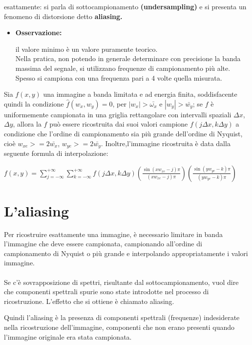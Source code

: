 esattamente: si parla di sottocampionamento \textbf{(undersampling)} e si
presenta un fenomeno di distorsione detto \textbf{aliasing.}
\begin{itemize}
    \item \textbf{Osservazione:}

          il valore minimo è un valore puramente teorico.
          \\Nella pratica, non potendo in generale determinare con precisione la banda massima del segnale, si utilizzano frequenze di campionamento più alte.
          \\Spesso si campiona con una frequenza pari a 4 volte quella misurata.
\end{itemize}
\begin{theorem}
    Sia $f(x,y)$ una immagine a banda limitata e ad energia finita,
    soddisfacente quindi la condizione $\hat{f}(w_x,w_y) = 0$, per $| w_x | > \bar{ω_x}$ e
    $| w_y | > \bar{w_y}$; se $f$ è uniformemente campionata in una griglia rettangolare
    con intervalli spaziali $\Delta x$, $\Delta y$, allora la $f$ può essere ricostruita dai suoi
    valori campione $f(j \Delta x, k \Delta y)$ a condizione che l’ordine di campionamento
    sia più grande dell’ordine di Nyquist, cioè $w_{xe} >= 2 \bar{w_x}$, $w_{ye} >= 2 \bar{w_y}$.
    Inoltre,l’immagine ricostruita è data dalla seguente formula di interpolazione:
\end{theorem}
\begin{center}
    $f(x,y) = \sum_{j=-\infty}^{+\infty} \sum_{k=-\infty}^{+\infty} f(j \Delta x, k \Delta y) (\frac{\sin(xw_{xe}-j)\pi}{(xw_{xe}-j)\pi})  (\frac{\sin(yw_{ye}-k)\pi}{(yw_{ye}-k)\pi})$
\end{center}
\section{L'aliasing}
Per ricostruire esattamente una immagine, è necessario limitare in
banda l’immagine che deve essere campionata, campionando all’ordine di campionamento di Nyquist o più grande e
interpolando appropriatamente i valori immagine.
\\\\Se c’è sovrapposizione di spettri, risultante dal
sottocampionamento, vuol dire che componenti spettrali spurie
sono state introdotte nel processo di ricostruzione. L’effetto che si
ottiene è chiamato aliasing.

Quindi l'aliasing è la presenza di componenti spettrali (frequenze)
indesiderate nella ricostruzione dell’immagine, componenti che non
erano presenti quando l’immagine originale era stata campionata.


